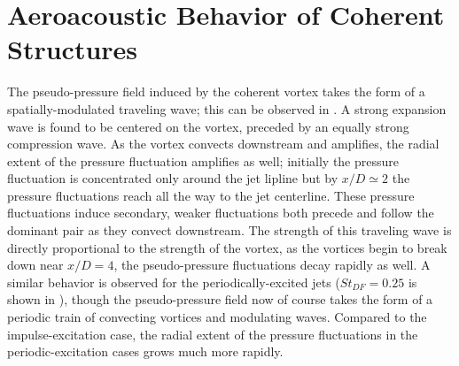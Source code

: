 \section{Aeroacoustic Behavior of Coherent Structures}
The pseudo-pressure field induced by the coherent vortex takes the form of a spatially-modulated traveling wave; this can be observed in .
A strong expansion wave is found to be centered on the vortex, preceded by an equally strong compression wave.
As the vortex convects downstream and amplifies, the radial extent of the pressure fluctuation amplifies as well; initially the pressure fluctuation is concentrated only around the jet lipline but by $x/D \simeq 2$ the pressure fluctuations reach all the way to the jet centerline.
These pressure fluctuations induce secondary, weaker fluctuations both precede and follow the dominant pair as they convect downstream.
The strength of this traveling wave is directly proportional to the strength of the vortex, as the vortices begin to break down near $x/D = 4$, the pseudo-pressure fluctuations decay rapidly as well. 
A similar behavior is observed for the periodically-excited jets ($St_{DF} = 0.25$ is shown in ), though the pseudo-pressure field now of course takes the form of a periodic train of convecting vortices and modulating waves.
Compared to the impulse-excitation case, the radial extent of the pressure fluctuations in the periodic-excitation cases grows much more rapidly.

